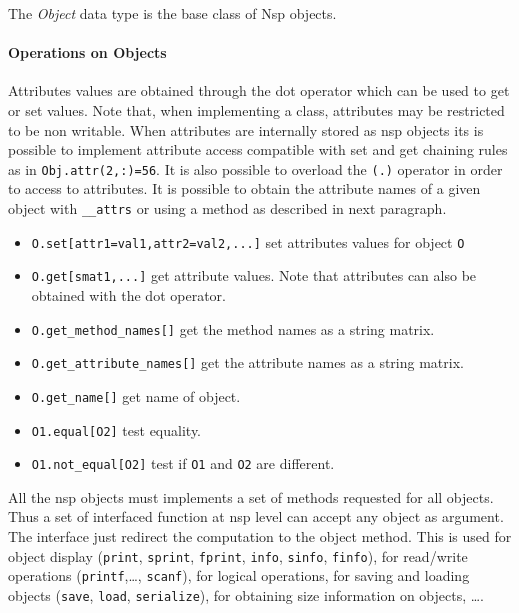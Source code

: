 
\begin{mandesc}
\end{mandesc}

\begin{mandescription}
The \emph{Object} data type is the base class of Nsp objects. 
\end{mandescription}

\paragraph{Operations on Objects}
Attributes values are obtained through the dot operator which can be used to get or set 
values. Note that, when implementing a class, attributes may be restricted to be non writable.
When attributes are internally stored as nsp objects its is possible to implement attribute 
access compatible with set and get chaining rules as in \verb+Obj.attr(2,:)=56+. It is also 
possible to overload the \verb+(.)+ operator in order to access to attributes. 
It is possible to obtain the attribute names of a given object with \verb+__attrs+ or using 
a method as described in next paragraph.
\begin{itemize}
\item \verb+O.set[attr1=val1,attr2=val2,...]+  set attributes values for object \verb+O+ 
\item \verb+O.get[smat1,...]+ get attribute values. Note that attributes can also be obtained with the dot 
  operator.
\item \verb+O.get_method_names[]+ get the method names as a string matrix.
\item \verb+O.get_attribute_names[]+ get the attribute names as a string matrix.
\item \verb+O.get_name[]+ get name of object. 
\item \verb+O1.equal[O2]+ test equality. 
\item \verb+O1.not_equal[O2]+ test if \verb!O1! and \verb!O2! are different.
\end{itemize}

All the nsp objects must implements a set of methods requested for all objects. 
Thus a set of interfaced function at nsp level can accept any object as argument. 
The interface just redirect the computation to the object method. 
This is used for object display (\verb+print+, \verb+sprint+, \verb+fprint+, 
\verb+info+, \verb+sinfo+, \verb+finfo+), for read/write operations (\verb+printf+,\ldots, 
\verb+scanf+), for logical operations, for saving and loading objects (\verb+save+, \verb+load+, 
\verb+serialize+), for obtaining size information on objects, \ldots.

